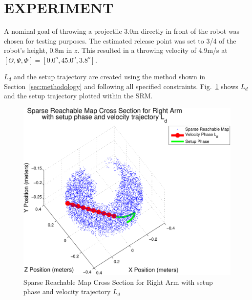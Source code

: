 \section{EXPERIMENT}
A nominal goal of throwing a projectile 3.0m directly in front of the robot was chosen for testing purposes.  The estimated release point was set to 3/4 of the robot's height, 0.8m in $z$.  This resulted in a throwing velocity of 4.9m/s at $[\Theta, \Psi, \Phi] =[0.0^o,45.0^o, 3.8^o]$.

$L_d$ and the setup trajectory are created using the method shown in Section~\ref{sec:methodology} and following all specified constraints.  Fig.~\ref{fig:3dThrowPlot1} shows $L_d$ and the setup trajectory plotted within the SRM.

\begin{figure}[thpb]
  \centering
\includegraphics[width=1.0\columnwidth]{./MATLAB/throwTraj3D.pdf}
  \caption{Sparse Reachable Map Cross Section for Right Arm with setup phase and velocity trajectory $L_d$ }
  \label{fig:3dThrowPlot1}
\end{figure}


